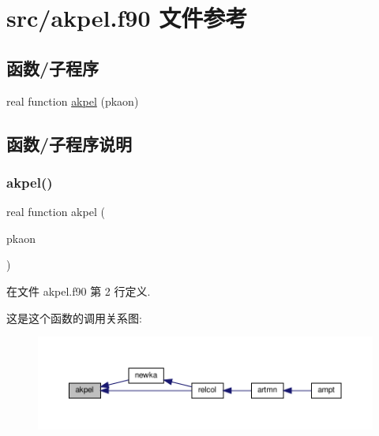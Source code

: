 \hypertarget{akpel_8f90}{}\section{src/akpel.f90 文件参考}
\label{akpel_8f90}
\subsection*{函数/子程序}
\begin{DoxyCompactItemize}
\item 
real function \mbox{\hyperlink{akpel_8f90_a8b3199ebfc1a79505469c41615306d25}{akpel}} (pkaon)
\end{DoxyCompactItemize}


\subsection{函数/子程序说明}
\mbox{\label{akpel_8f90_a8b3199ebfc1a79505469c41615306d25}} 
\subsubsection{\texorpdfstring{akpel()}{akpel()}}
{\footnotesize\ttfamily real function akpel (\begin{DoxyParamCaption}\item[{}]{pkaon }\end{DoxyParamCaption})}



在文件 akpel.\+f90 第 2 行定义.

这是这个函数的调用关系图\+:
\nopagebreak
\begin{figure}[H]
\begin{center}
\leavevmode
\includegraphics[width=350pt]{akpel_8f90_a8b3199ebfc1a79505469c41615306d25_icgraph}
\end{center}
\end{figure}
